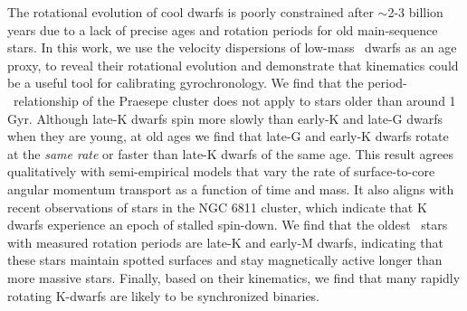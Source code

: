 
The rotational evolution of cool dwarfs is poorly constrained after $\sim$2-3
billion years due to a lack of precise ages and rotation periods for old
main-sequence stars.
In this work, we use the velocity dispersions of low-mass \kepler\ dwarfs as
an age proxy, to reveal their rotational evolution and demonstrate that
kinematics could be a useful tool for calibrating gyrochronology.
We find that the period-\teff\ relationship of the Praesepe cluster does not
apply to stars older than around 1 Gyr.
Although late-K dwarfs spin more slowly than early-K and late-G dwarfs when
they are young, at old ages we find that late-G and early-K dwarfs rotate at
the {\it same rate} or faster than late-K dwarfs of the same age.
This result agrees qualitatively with semi-empirical models that vary the rate
of surface-to-core angular momentum transport as a function of time and mass.
It also aligns with recent observations of stars in the NGC 6811 cluster,
which indicate that K dwarfs experience an epoch of stalled spin-down.
We find that the oldest \kepler\ stars with measured rotation periods are
late-K and early-M dwarfs, indicating that these stars maintain spotted
surfaces and stay magnetically active longer than more massive stars.
Finally, based on their kinematics, we find that many rapidly rotating
K-dwarfs are likely to be synchronized binaries.

